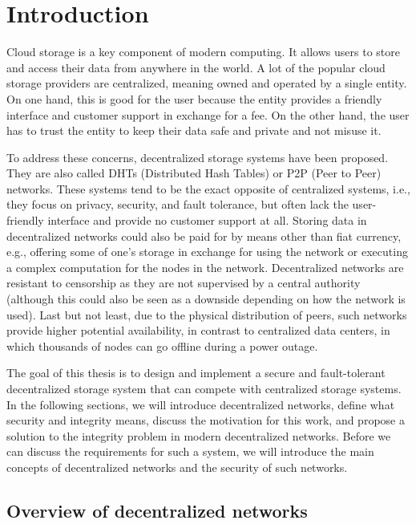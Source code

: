 \label{chapter:introduction}
\chapter{Introduction}

Cloud storage is a key component of modern computing.
It allows users to store and access their data from anywhere in the world.
A lot of the popular cloud storage providers are centralized, meaning owned and operated by a single entity.
On one hand, this is good for the user because the entity provides a friendly interface and customer support
in exchange for a fee.
On the other hand, the user has to trust the entity to keep their data safe and private and not misuse it.

To address these concerns, decentralized storage systems have been proposed.
They are also called DHTs (Distributed Hash Tables) or P2P (Peer to Peer) networks.
These systems tend to be the exact opposite of centralized systems, i.e., they focus on privacy, security,
and fault tolerance, but often lack the user-friendly interface and provide no customer support at all.
Storing data in decentralized networks could also be paid for by means other than fiat currency,
e.g., offering some of one's storage in exchange for using the network or executing a complex computation
for the nodes in the network.
Decentralized networks are resistant to censorship as they are not supervised by a central authority
(although this could also be seen as a downside depending on how the network is used).
Last but not least, due to the physical distribution of peers, such networks provide higher potential availability,
in contrast to centralized data centers, in which thousands of nodes can go offline during a power outage.

The goal of this thesis is to design and implement a secure and fault-tolerant decentralized storage system
that can compete with centralized storage systems.
In the following sections, we will introduce decentralized networks,
define what security and integrity means, discuss the motivation for this work,
and propose a solution to the integrity problem in modern decentralized networks.
Before we can discuss the requirements for such a system, we will introduce the main
concepts of decentralized networks and the security of such networks.

\section{Overview of decentralized networks}

